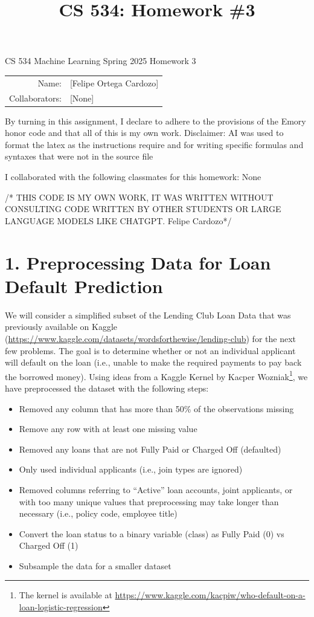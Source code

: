 \documentclass[11pt]{article}
\title{CS 534: Homework \#3}
\begin{document}
\begin{center}
{\Large CS 534 Machine Learning Spring 2025 Homework 3}
\vspace{.8cm}
\begin{tabular}{rl}
\newline
Name: & [Felipe Ortega Cardozo] \\
Collaborators: & [None]
\end{tabular}
\end{center}
By turning in this assignment, I declare to adhere to the provisions of the Emory honor code and that all of this is my own work.
Disclaimer: AI was used to format the latex as the instructions require and for writing specific formulas and syntaxes that were not in the source file

I collaborated with the following classmates for this homework:
None


/* THIS CODE IS MY OWN WORK, IT WAS WRITTEN WITHOUT
CONSULTING CODE WRITTEN BY OTHER STUDENTS
OR LARGE LANGUAGE MODELS LIKE CHATGPT.
Felipe Cardozo*/




\section*{1. Preprocessing Data for Loan Default Prediction}

We will consider a simplified subset of the Lending Club Loan Data that was previously available on Kaggle (\url{https://www.kaggle.com/datasets/wordsforthewise/lending-club}) for the next few problems. The goal is to determine whether or not an individual applicant will default on the loan (i.e., unable to make the required payments to pay back the borrowed money). Using ideas from a Kaggle Kernel by Kacper Wozniak\footnote{The kernel is available at \url{https://www.kaggle.com/kacpiw/who-default-on-a-loan-logistic-regression}}, we have preprocessed the dataset with the following steps:

\begin{itemize}
    \item Removed any column that has more than 50\% of the observations missing
    \item Remove any row with at least one missing value
    \item Removed any loans that are not Fully Paid or Charged Off (defaulted)
    \item Only used individual applicants (i.e., join types are ignored)
    \item Removed columns referring to ``Active'' loan accounts, joint applicants, or with too many unique values that preprocessing may take longer than necessary (i.e., policy code, employee title)
    \item Convert the loan status to a binary variable (class) as Fully Paid (0) vs Charged Off (1)
    \item Subsample the data for a smaller dataset
\end{itemize}
\end{document}
